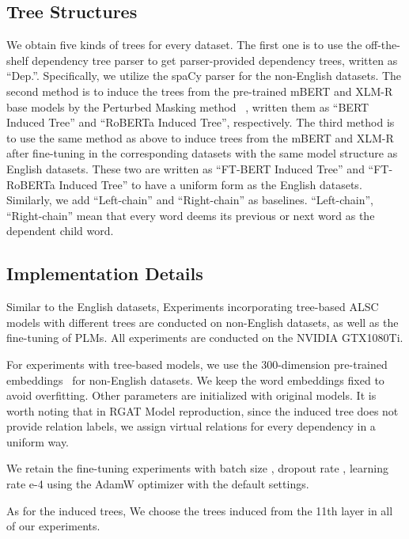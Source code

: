 \documentclass[11pt]{article}
\begin{document}
\subsection{Tree Structures}
We obtain five kinds of trees for every dataset. The first one is to use the off-the-shelf dependency tree parser to get parser-provided dependency trees, written as “Dep.”. Specifically,  we utilize the spaCy parser for the non-English datasets. The second method is to induce the trees from the pre-trained mBERT and XLM-R~\citep{DBLP:conf/acl/ConneauKGCWGGOZ20} base models by the Perturbed Masking method ~\citep{DBLP:conf/acl/WuCKL20}, written them as ``BERT Induced Tree'' and ``RoBERTa Induced Tree'', respectively. The third method is to use the same method as above to induce trees from the mBERT and XLM-R after fine-tuning in the corresponding datasets with the same model structure as English datasets. These two are written as ``FT-BERT Induced Tree'' and ``FT-RoBERTa Induced Tree'' to have a uniform form as the English datasets.  Similarly,  we add ``Left-chain'' and ``Right-chain'' as baselines. ``Left-chain'', ``Right-chain'' mean that every word deems its previous or next word as the dependent child word.
\subsection{Implementation Details}
Similar to the English datasets, Experiments incorporating tree-based ALSC models with different trees are conducted on non-English datasets, as well as the fine-tuning of PLMs. All experiments are conducted on the  NVIDIA GTX1080Ti.

For experiments with tree-based models, we use the 300-dimension pre-trained embeddings~\citep{DBLP:conf/emnlp/RuderGB16} for non-English datasets. We keep the word embeddings fixed to avoid overfitting. Other parameters are initialized with original models. It is worth noting that in RGAT Model reproduction, since the induced tree does not provide relation labels, we assign virtual relations for every dependency in a uniform way.

We retain the  fine-tuning experiments with batch size , dropout rate , learning rate e-4 using the AdamW optimizer with the default settings.

As for the induced trees, We choose the trees induced from the 11th layer in  all of our experiments.
\end{document}
